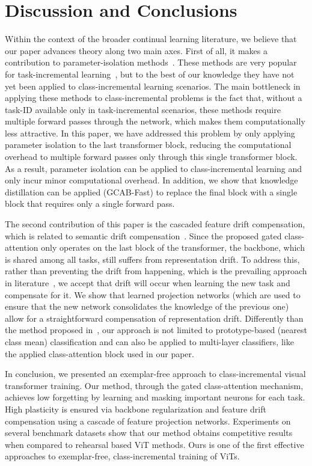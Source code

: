 \documentclass[twocolumn]{svjour3}          %
\begin{document}
\section{Discussion and Conclusions}
Within the context of the broader continual learning literature, we believe that our paper advances theory along two main axes. First of all, it makes a contribution to parameter-isolation methods~\citep{delange2021continual}. These methods are very popular for task-incremental learning~\citep{mallya2018packnet,mallya2018piggyback, serra2018overcoming}, but to the best of our knowledge they have not yet been applied to class-incremental learning scenarios. The main bottleneck in applying these methods to class-incremental problems is the fact that, without a task-ID available only in task-incremental scenarios, these methods require multiple forward passes through the network, which makes them computationally less attractive. In this paper, we have addressed this problem by only applying parameter isolation to the last transformer block, reducing the computational overhead to multiple forward passes only through this single transformer block. As a result, parameter isolation can be applied to class-incremental learning and only incur minor computational overhead. In addition, we show that knowledge distillation can be applied (GCAB-Fast) to replace the final block with a single block that requires only a single forward pass.

The second contribution of this paper is the cascaded feature drift compensation, which is related to semantic drift compensation~\citep{yu2020semantic}. Since the proposed gated class-attention only operates on the last block of the transformer, the backbone, which is shared among all tasks, still suffers from representation drift. To address this, rather than preventing the drift from happening, which is the prevailing approach in literature~\citep{kirkpatrick2017overcoming, li2017learning}, we accept that drift will occur when learning the new task and compensate for it. We show that learned projection networks (which are used to ensure that the new network consolidates the knowledge of the previous one) allow for a straightforward compensation of representation drift. Differently than the method proposed in~\citep{yu2020semantic}, our approach is not limited to prototype-based (nearest class mean) classification and can also be applied to multi-layer classifiers, like the applied class-attention block used in our paper. 

In conclusion, we presented an exemplar-free approach to class-incremental visual transformer training. Our method, through the gated class-attention mechanism,  achieves low forgetting by learning and masking important neurons for each task. High plasticity is ensured via backbone regularization and feature drift compensation using a cascade of feature projection networks. Experiments on several benchmark datasets show that our method obtains competitive results when compared to rehearsal based ViT methods. Ours is one of the first effective approaches to exemplar-free, class-incremental training of ViTs. 
\end{document}
